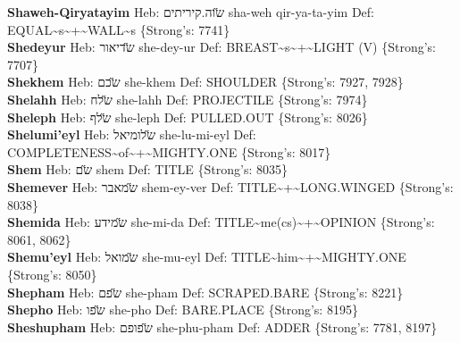 {\textbf{Shaweh-Qiryatayim} Heb: {\large\H שוה.קיריתים} sha-weh qir-ya-ta-yim Def: EQUAL\textasciitilde{}s\textasciitilde{}+\textasciitilde{}WALL\textasciitilde{}s \{Strong's: 7741\}\hfill{}\\

\textbf{Shedeyur} Heb: {\large\H שדיאור} she-dey-ur Def: BREAST\textasciitilde{}s\textasciitilde{}+\textasciitilde{}LIGHT (V) \{Strong's: 7707\}\hfill{}\\

\textbf{Shekhem} Heb: {\large\H שכם} she-khem Def: SHOULDER \{Strong's: 7927, 7928\}\hfill{}\\

\textbf{Shelahh} Heb: {\large\H שלח} she-lahh Def: PROJECTILE \{Strong's: 7974\}\hfill{}\\

\textbf{Sheleph} Heb: {\large\H שלף} she-leph Def: PULLED.OUT \{Strong's: 8026\}\hfill{}\\

\textbf{Shelumi'eyl} Heb: {\large\H שלומיאל} she-lu-mi-eyl Def: COMPLETENESS\textasciitilde{}of\textasciitilde{}+\textasciitilde{}MIGHTY.ONE \{Strong's: 8017\}\hfill{}\\

\textbf{Shem} Heb: {\large\H שם} shem Def: TITLE \{Strong's: 8035\}\hfill{}\\

\textbf{Shemever} Heb: {\large\H שמאבר} shem-ey-ver Def: TITLE\textasciitilde{}+\textasciitilde{}LONG.WINGED \{Strong's: 8038\}\hfill{}\\

\textbf{Shemida} Heb: {\large\H שמידע} she-mi-da Def: TITLE\textasciitilde{}me(cs)\textasciitilde{}+\textasciitilde{}OPINION \{Strong's: 8061, 8062\}\hfill{}\\

\textbf{Shemu'eyl} Heb: {\large\H שמואל} she-mu-eyl Def: TITLE\textasciitilde{}him\textasciitilde{}+\textasciitilde{}MIGHTY.ONE \{Strong's: 8050\}\hfill{}\\

\textbf{Shepham} Heb: {\large\H שפם} she-pham Def: SCRAPED.BARE \{Strong's: 8221\}\hfill{}\\

\textbf{Shepho} Heb: {\large\H שפו} she-pho Def: BARE.PLACE \{Strong's: 8195\}\hfill{}\\

\textbf{Sheshupham} Heb: {\large\H שפופם} she-phu-pham Def: ADDER \{Strong's: 7781, 8197\}\hfill{}\\

}
